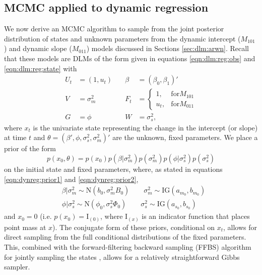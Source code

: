 \subsection{MCMC applied to dynamic regression \label{sec:mcmc:dr}}

We now derive an MCMC algorithm to sample from the joint posterior distribution of states and unknown parameters from the dynamic intercept ($M_{101}$) and dynamic slope ($M_{011}$) models discussed in Sections \ref{sec:dlm:arwn}. Recall that these models are DLMs of the form given in equations \eqref{eqn:dlm:reg:obs} and \eqref{eqn:dlm:reg:state} with
\begin{align*}
U_t &= (1, u_t) &\quad \beta &= (\beta_0, \beta_1)' \\
V &= \sigma^2_m &\quad F_t &= \left\{\begin{array}{ll} 1, & \mbox{for} M_{101} \\ u_t, & \mbox{for} M_{011} \end{array}\right. \\
G &= \phi &\quad W &= \sigma^2_s,
\end{align*}
where $x_t$ is the univariate state representing the change in the intercept (or slope) at time $t$ and $\theta = (\beta',\phi,\sigma^2_s,\sigma^2_m)'$ are the unknown, fixed parameters. We place a prior of the form
\begin{equation}
p(x_0, \theta) = p(x_0)p(\beta|\sigma^2_m)p(\sigma^2_m)p(\phi|\sigma^2_s)p(\sigma^2_s) \label{eqn:dr:prior}
\end{equation}
on the initial state and fixed parameters, where, as stated in equations \eqref{eqn:dynreg:prior1} and \eqref{eqn:dynreg:prior2},
\begin{align*}
&\beta|\sigma^2_m \sim \mbox{N}(b_0, \sigma^2_mB_0) \qquad \sigma^2_m \sim \mbox{IG}(a_{m_0}, b_{m_0}) \\
&\phi|\sigma^2_s \sim \mbox{N}(\phi_0, \sigma^2_s\Phi_0) \qquad \sigma^2_s \sim \mbox{IG}(a_{s_0}, b_{s_0})
\end{align*}
and $x_0 = 0$ (i.e. $p(x_0) = \mbox{I}_{(0)}$, where $\mbox{I}_(x)$ is an indicator function that places point mass at $x$). The conjugate form of these priors, conditional on $x_t$, allows for direct sampling from the full conditional distributions of the fixed parameters. This, combined with the forward-filtering backward sampling (FFBS) algorithm for jointly sampling the states \citep{Cart:Kohn:on:1994}, allows for a relatively straightforward Gibbs sampler.

